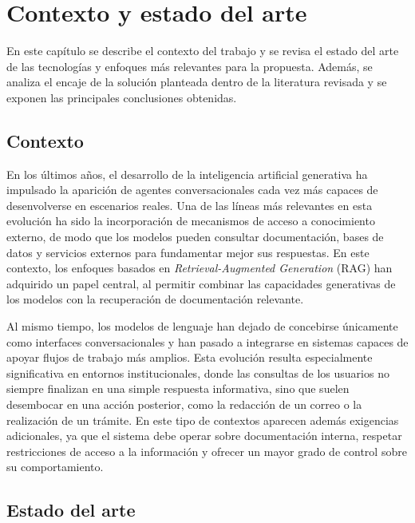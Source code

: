 \chapter{Contexto y estado del arte}\label{chap:estadodelarte}

En este capítulo se describe el contexto del trabajo y se revisa el estado del arte de las tecnologías y enfoques más relevantes para la propuesta. 
Además, se analiza el encaje de la solución planteada dentro de la literatura revisada y se exponen las principales conclusiones obtenidas.

\section{Contexto}

En los últimos años, el desarrollo de la inteligencia artificial generativa ha impulsado la aparición de agentes conversacionales cada vez más capaces de desenvolverse en escenarios reales. 
Una de las líneas más relevantes en esta evolución ha sido la incorporación de mecanismos de acceso a conocimiento externo, de modo que los modelos pueden consultar documentación, bases de datos y servicios externos para fundamentar mejor sus respuestas. 
En este contexto, los enfoques basados en \textit{Retrieval-Augmented Generation} (RAG) \parencite{lewis2020rag} han adquirido un papel central, al permitir combinar las capacidades generativas de los modelos con la recuperación de documentación relevante.

Al mismo tiempo, los modelos de lenguaje han dejado de concebirse únicamente como interfaces conversacionales y han pasado a integrarse en sistemas capaces de apoyar flujos de trabajo más amplios. 
Esta evolución resulta especialmente significativa en entornos institucionales, donde las consultas de los usuarios no siempre finalizan en una simple respuesta informativa, sino que suelen desembocar en una acción posterior, como la redacción de un correo o la realización de un trámite. 
En este tipo de contextos aparecen además exigencias adicionales, ya que el sistema debe operar sobre documentación interna, respetar restricciones de acceso a la información y ofrecer un mayor grado de control sobre su comportamiento.

\section{Estado del arte}

